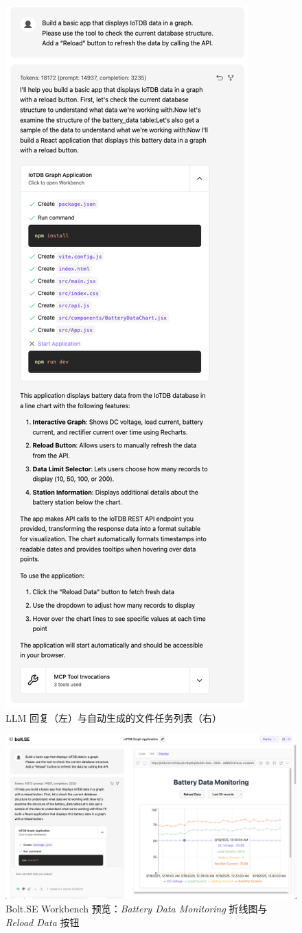 \begin{figure}[htbp]
  \centering
  \includegraphics[width=.5\textwidth]{figures/screenshots/iotdb-demo/prompt-and-files.png}
  \caption{LLM 回复（左）与自动生成的文件任务列表（右）}
  \label{fig:prompt-and-files}
\end{figure}

\begin{figure}[htbp]
  \centering
  \includegraphics[width=.6\textwidth]{figures/screenshots/iotdb-demo/app-preview.png}
  \caption{Bolt.SE Workbench 预览：\textit{Battery Data Monitoring} 折线图与 \textit{Reload Data} 按钮}
  \label{fig:app-preview}
\end{figure}

